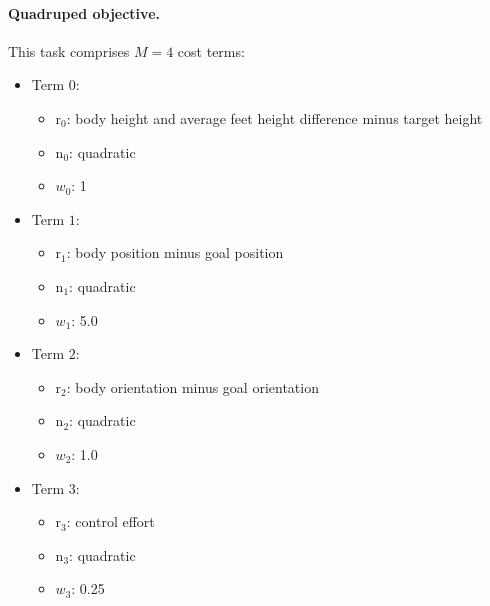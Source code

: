 \paragraph{Quadruped objective.} \label{ps_obj_quadruped}
This task comprises $M = 4$ cost terms: 
\begin{itemize}
	\item Term $0$:
	\begin{itemize}
		\item[] $\text{r}_0$: body height and average feet height difference minus target height
		\item[] $\text{n}_0$: quadratic
		\item[] $w_0$: 1
	\end{itemize}
	\item Term $1$:
	\begin{itemize}
		\item[] $\text{r}_1$: body position minus goal position
		\item[] $\text{n}_1$: quadratic
		\item[] $w_1$: 5.0
	\end{itemize}
	\item Term $2$:
	\begin{itemize}
		\item[] $\text{r}_2$: body orientation minus goal orientation
		\item[] $\text{n}_2$: quadratic
		\item[] $w_2$: 1.0
	\end{itemize}
	\item Term $3$:
	\begin{itemize}
		\item[] $\text{r}_3$: control effort
		\item[] $\text{n}_3$: quadratic
		\item[] $w_3$: 0.25
	\end{itemize}
\end{itemize}

